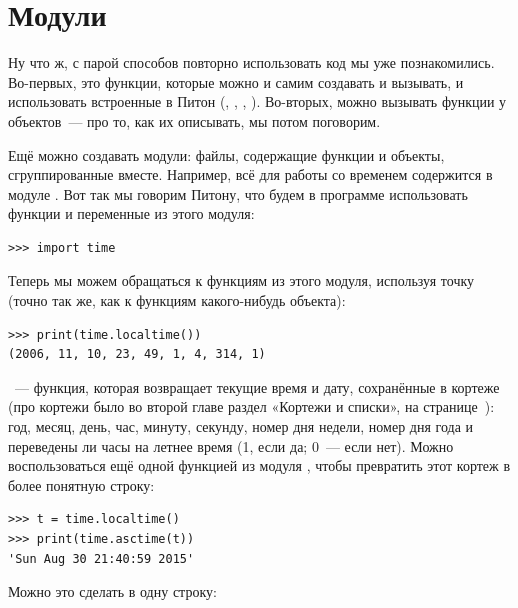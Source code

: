 \section{Модули}

Ну что ж, с парой способов повторно использовать код мы уже познакомились. Во-первых, это функции, которые можно и самим создавать и вызывать, и использовать встроенные в Питон (, , , ). Во-вторых, можно вызывать функции у объектов — про то, как их описывать, мы потом поговорим.

Ещё можно создавать модули: файлы, содержащие функции и объекты, сгруппированные вместе. Например, всё для работы со временем содержится в модуле . Вот так мы говорим Питону, что будем в программе использовать функции и переменные из этого модуля:

\begin{listing}
\begin{verbatim}
>>> import time
\end{verbatim}
\end{listing}

Теперь мы можем обращаться к функциям из этого модуля, используя точку (точно так же, как к функциям какого-нибудь объекта):

\begin{listing}
\begin{verbatim}
>>> print(time.localtime())
(2006, 11, 10, 23, 49, 1, 4, 314, 1)
\end{verbatim}
\end{listing}

 — функция, которая возвращает текущие время и дату, сохранённые в кортеже (про кортежи было во второй главе раздел «Кортежи и списки», на странице \pageref{tuplesandlists}): год, месяц, день, час, минуту, секунду, номер дня недели, номер дня года и переведены ли часы на летнее время (1, если да; 0 — если нет). Можно воспользоваться ещё одной функцией из модуля , чтобы превратить этот кортеж в более понятную строку:

\begin{listing}
\begin{verbatim}
>>> t = time.localtime()
>>> print(time.asctime(t))
'Sun Aug 30 21:40:59 2015'
\end{verbatim}
\end{listing}

Можно это сделать в одну строку:


